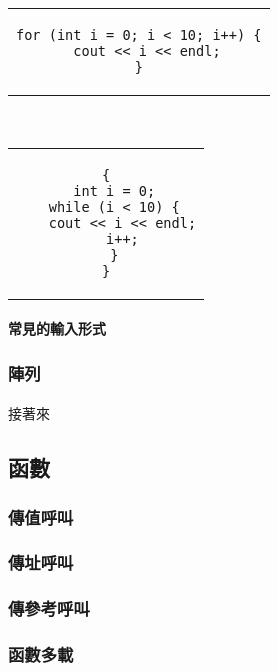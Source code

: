 \documentclass[12pt,a4paper,oneside]{article}
\begin{document}
\begin{CJK}{UTF8}{bkai}
\begin{code}[h!]
\centering
\begin{subcode}{.48\textwidth}
\centering
\begin{tabular}{c}
\begin{lstlisting}
for (int i = 0; i < 10; i++) {
  cout << i << endl;
}
\end{lstlisting}
\end{tabular}
\caption{\lstinline!for! 語法}
\end{subcode}
~
\begin{subcode}{.48\textwidth}
\centering
\begin{tabular}{c}
\begin{lstlisting}
{
  int i = 0;
  while (i < 10) {
    cout << i << endl;
    i++;
  }
}
\end{lstlisting}
\end{tabular}
\caption{對應的 \lstinline!while! 語法}
\end{subcode}
\caption{\lstinline!for! 和 \lstinline!while! 的對應關係}
\label{program:struct:code:loop:for:while}
\end{code}

\paragraph{常見的輸入形式}

\subsubsection{陣列}

\paragraph{}接著來

\subsection{函數}
\subsubsection{傳值呼叫}
\subsubsection{傳址呼叫}
\subsubsection{傳參考呼叫}
\subsubsection{函數多載}

\end{CJK}
\end{document}
